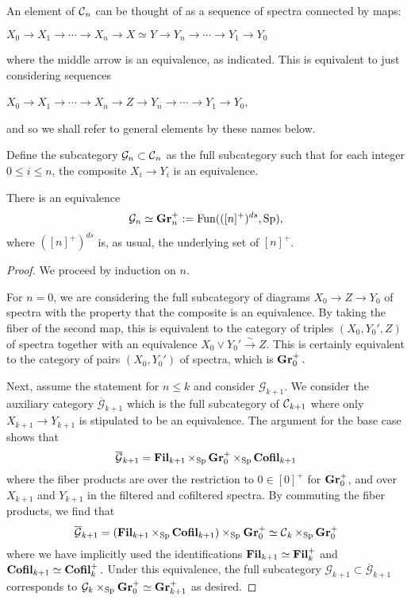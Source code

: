An element of $\operatorname{\mathcal{C}}_n$ can be thought of as a sequence of spectra connected by maps:
\begin{center}
$X_0 \longrightarrow X_1 \longrightarrow \cdots \longrightarrow X_n \longrightarrow X \simeq Y \longrightarrow Y_n \longrightarrow \cdots \longrightarrow Y_1 \longrightarrow Y_0$
\end{center}
where the middle arrow is an equivalence, as indicated.  This is equivalent to just considering sequences
\begin{center}
$X_0 \longrightarrow X_1 \longrightarrow \cdots \longrightarrow X_n \longrightarrow Z \longrightarrow Y_n \longrightarrow \cdots \longrightarrow Y_1 \longrightarrow Y_0$,
\end{center}
and so we shall refer to general elements by these names below.   


Define the subcategory $\mathcal{G}_n\subset \operatorname{\mathcal{C}}_n$ as the full subcategory such that for each integer $0\leq i\leq n$, the composite $X_i \longrightarrow Y_i$ is an equivalence.  

\begin{lem}
There is an equivalence $$\mathcal{G}_n \simeq \operatorname{\textbf{Gr}}_n^+ := \operatorname{\text{Fun}}(([n]^{+})^{ds}, \operatorname{\text{Sp}}),$$
where $([n]^+)^{ds}$ is, as usual, the underlying set of $[n]^+$.  
\end{lem}
\begin{proof}
We proceed by induction on $n$.  

For $n=0$, we are considering the full subcategory of diagrams $X_0 \to Z \to Y_0$ of spectra with the property that the composite is an equivalence.  By taking the fiber of the second map, this is equivalent to the category of triples $(X_0, Y_0',Z)$ of spectra together with an equivalence $X_0 \vee Y_0' \xrightarrow{\sim} Z.$   This is  certainly equivalent to the category of pairs $(X_0, Y_0')$ of spectra, which is $\operatorname{\textbf{Gr}}_0^+.$  

Next, assume the statement for $n\leq k$ and consider $\mathcal{G}_{k+1}.$  We consider the auxiliary category $\overline{\mathcal{G}}_{k+1}$ which is the full subcategory of $\operatorname{\mathcal{C}}_{k+1}$ where only $X_{k+1} \to Y_{k+1}$ is stipulated to be an equivalence.    The argument for the base case shows that $$\overline{\mathcal{G}}_{k+1} = \operatorname{\textbf{Fil}}_{k+1} \times_{\operatorname{\text{Sp}}} \operatorname{\textbf{Gr}}_0^+ \times_{\operatorname{\text{Sp}}} \operatorname{\textbf{Cofil}}_{k+1}$$ where the fiber products are over the restriction to $0\in [0]^+$ for $\operatorname{\textbf{Gr}}_0^+$, and over $X_{k+1}$ and $Y_{k+1}$ in the filtered and cofiltered spectra.  By commuting the fiber products, we find that $$\overline{\mathcal{G}}_{k+1} = (\operatorname{\textbf{Fil}}_{k+1} \times_{\operatorname{\text{Sp}}} \operatorname{\textbf{Cofil}}_{k+1}) \times_{\operatorname{\text{Sp}}} \operatorname{\textbf{Gr}}_0^+  \simeq \operatorname{\mathcal{C}}_k \times_{\operatorname{\text{Sp}}} \operatorname{\textbf{Gr}}_0^+$$ where we have implicitly used the identifications $\operatorname{\textbf{Fil}}_{k+1} \simeq \operatorname{\textbf{Fil}}_k^+$ and $\operatorname{\textbf{Cofil}}_{k+1} \simeq \operatorname{\textbf{Cofil}}_k^+.$   Under this equivalence, the full subcategory $\mathcal{G}_{k+1} \subset \overline{\mathcal{G}}_{k+1}$ corresponds to $\mathcal{G}_k \times_{\operatorname{\text{Sp}}} \operatorname{\textbf{Gr}}_0^+ \simeq \operatorname{\textbf{Gr}}_{k+1}^+$ as desired.  

\end{proof}



